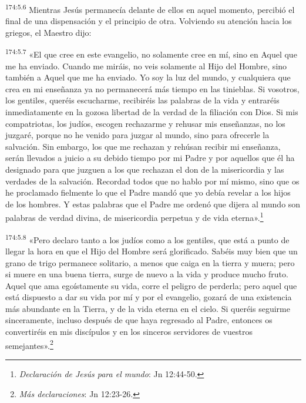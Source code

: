 \par 
\textsuperscript{174:5.6} Mientras Jesús permanecía delante de ellos en aquel momento, percibió el final de una dispensación y el principio de otra. Volviendo su atención hacia los griegos, el Maestro dijo:

\par 
\textsuperscript{174:5.7} «El que cree en este evangelio, no solamente cree en mí, sino en Aquel que me ha enviado. Cuando me miráis, no veis solamente al Hijo del Hombre, sino también a Aquel que me ha enviado. Yo soy la luz del mundo, y cualquiera que crea en mi enseñanza ya no permanecerá más tiempo en las tinieblas. Si vosotros, los gentiles, queréis escucharme, recibiréis las palabras de la vida y entraréis inmediatamente en la gozosa libertad de la verdad de la filiación con Dios. Si mis compatriotas, los judíos, escogen rechazarme y rehusar mis enseñanzas, no los juzgaré, porque no he venido para juzgar al mundo, sino para ofrecerle la salvación. Sin embargo, los que me rechazan y rehúsan recibir mi enseñanza, serán llevados a juicio a su debido tiempo por mi Padre y por aquellos que él ha designado para que juzguen a los que rechazan el don de la misericordia y las verdades de la salvación. Recordad todos que no hablo por mí mismo, sino que os he proclamado fielmente lo que el Padre mandó que yo debía revelar a los hijos de los hombres. Y estas palabras que el Padre me ordenó que dijera al mundo son palabras de verdad divina, de misericordia perpetua y de vida eterna».\footnote{\textit{Declaración de Jesús para el mundo}: Jn 12:44-50.}

\par 
\textsuperscript{174:5.8} «Pero declaro tanto a los judíos como a los gentiles, que está a punto de llegar la hora en que el Hijo del Hombre será glorificado. Sabéis muy bien que un grano de trigo permanece solitario, a menos que caiga en la tierra y muera; pero si muere en una buena tierra, surge de nuevo a la vida y produce mucho fruto. Aquel que ama egoístamente su vida, corre el peligro de perderla; pero aquel que está dispuesto a dar su vida por mí y por el evangelio, gozará de una existencia más abundante en la Tierra, y de la vida eterna en el cielo. Si queréis seguirme sinceramente, incluso después de que haya regresado al Padre, entonces os convertiréis en mis discípulos y en los sinceros servidores de vuestros semejantes».\footnote{\textit{Más declaraciones}: Jn 12:23-26.}

